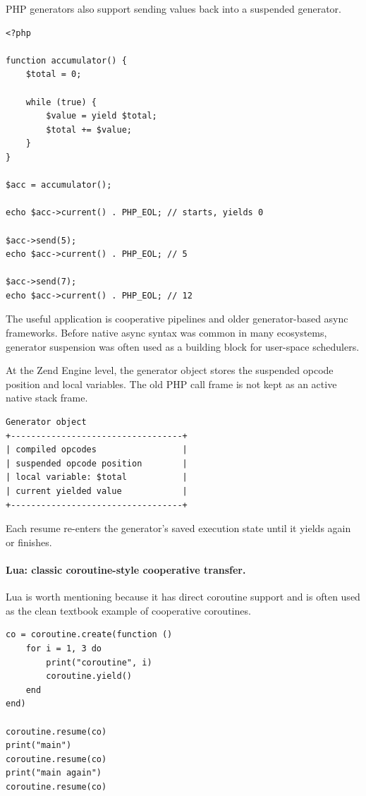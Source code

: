 PHP generators also support sending values back into a suspended generator.

\begin{verbatim}
<?php

function accumulator() {
    $total = 0;

    while (true) {
        $value = yield $total;
        $total += $value;
    }
}

$acc = accumulator();

echo $acc->current() . PHP_EOL; // starts, yields 0

$acc->send(5);
echo $acc->current() . PHP_EOL; // 5

$acc->send(7);
echo $acc->current() . PHP_EOL; // 12
\end{verbatim}

The useful application is cooperative pipelines and older generator-based async frameworks. Before native async syntax was common in many ecosystems, generator suspension was often used as a building block for user-space schedulers.

At the Zend Engine level, the generator object stores the suspended opcode position and local variables. The old PHP call frame is not kept as an active native stack frame.

\begin{verbatim}
Generator object
+----------------------------------+
| compiled opcodes                 |
| suspended opcode position        |
| local variable: $total           |
| current yielded value            |
+----------------------------------+
\end{verbatim}

Each resume re-enters the generator's saved execution state until it yields again or finishes.

\paragraph{Lua: classic coroutine-style cooperative transfer.}

Lua is worth mentioning because it has direct coroutine support and is often used as the clean textbook example of cooperative coroutines.

\begin{verbatim}
co = coroutine.create(function ()
    for i = 1, 3 do
        print("coroutine", i)
        coroutine.yield()
    end
end)

coroutine.resume(co)
print("main")
coroutine.resume(co)
print("main again")
coroutine.resume(co)
\end{verbatim}


